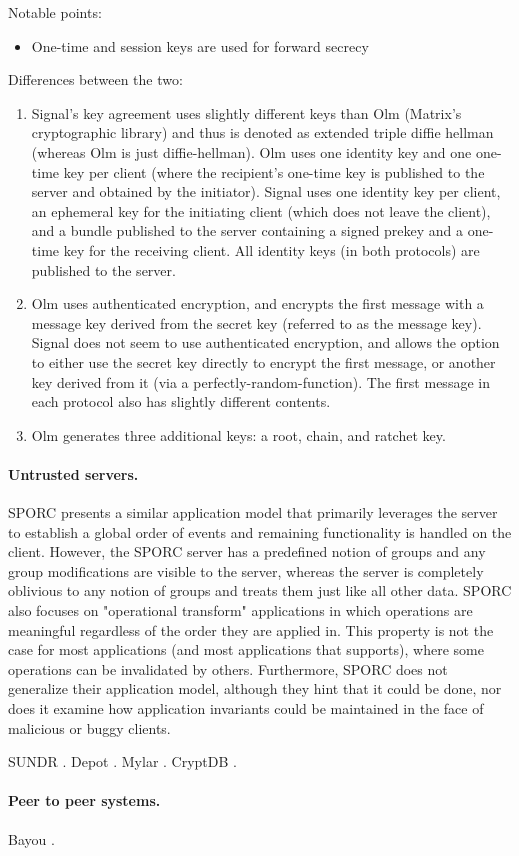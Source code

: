 Notable points:
\begin{itemize}
\item One-time and session keys are used for forward secrecy
\end{itemize}

Differences between the two:
\begin{enumerate}
\item
Signal's key agreement uses slightly different keys than Olm
(Matrix's cryptographic library) and thus is denoted as extended
triple diffie hellman (whereas Olm is just diffie-hellman).
Olm uses one identity key 
and one one-time key per client (where the recipient's 
one-time key is published to the server and obtained by the
initiator). Signal uses one identity key per client, an 
ephemeral key for the initiating client (which does not leave
the client), and a bundle published to the server containing
a signed prekey and a one-time key for the receiving client.
All identity keys (in both protocols) are published to the server.
\item Olm uses authenticated encryption, and encrypts the first message with a message key derived from the 
secret key (referred to as the message key). Signal does 
not seem to use authenticated 
encryption, and allows the option to either use the secret
key directly to encrypt the first message, or another key
derived from it (via a perfectly-random-function). The first
message in each protocol also has slightly different 
contents.
\item Olm generates three additional keys: a root, chain, 
and ratchet key.
\end{enumerate}

\paragraph{Untrusted servers.}
SPORC \cite{sporc} presents a similar application model that primarily leverages the server to establish a global order of events and remaining functionality is handled on the client. However, the SPORC server has a predefined notion of groups and any group modifications are visible to the server, whereas the \name server is completely oblivious to any notion of groups and treats them just like all other data. SPORC also focuses on "operational transform" applications in which operations are meaningful regardless of the order they are applied in. This property is not the case for most applications (and most applications that \name supports), where some operations can be invalidated by others. Furthermore, SPORC does not generalize their application model, although they hint that it could be done, nor does it examine how application invariants could be maintained in the face of malicious or buggy clients. 

SUNDR \cite{sundr}.
Depot \cite{depot}.
Mylar \cite{mylar}.
CryptDB \cite{cryptdb}.

\paragraph{Peer to peer systems.}

Bayou \cite{}.
